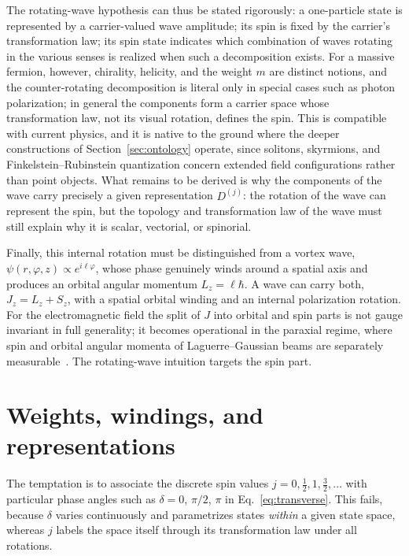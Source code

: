 \documentclass[11pt,a4paper]{article}
\begin{document}
The rotating-wave hypothesis can thus be stated rigorously: a one-particle state is represented by a
carrier-valued wave amplitude; its spin is fixed by the carrier's transformation law; its spin state
indicates which combination of waves rotating in the various senses is realized when such a decomposition
exists.
For a massive fermion, however, chirality, helicity, and the weight $m$ are distinct notions, and the
counter-rotating decomposition is literal only in special cases such as photon polarization; in general the
components form a carrier space whose transformation law, not its visual rotation, defines the spin.
This is compatible with current physics, and it is native to the ground where the deeper constructions of
Section~\ref{sec:ontology} operate, since solitons, skyrmions, and Finkelstein--Rubinstein quantization
concern extended field configurations rather than point objects.
What remains to be derived is why the components of the wave carry precisely a given representation
$D^{(j)}$: the rotation of the wave can represent the spin, but the topology and transformation law of the
wave must still explain why it is scalar, vectorial, or spinorial.

Finally, this internal rotation must be distinguished from a vortex wave,
$\psi(r, \varphi, z) \propto e^{i\ell\varphi}$, whose phase genuinely winds around a spatial axis and
produces an orbital angular momentum $L_z = \ell\hbar$.
A wave can carry both, $J_z = L_z + S_z$, with a spatial orbital winding and an internal polarization
rotation.
For the electromagnetic field the split of $J$ into orbital and spin parts is not gauge invariant in full
generality; it becomes operational in the paraxial regime, where spin and orbital angular momenta of
Laguerre--Gaussian beams are separately measurable~\cite{Allen1992}.
The rotating-wave intuition targets the spin part.

\section{Weights, windings, and representations}
\label{sec:representations}

The temptation is to associate the discrete spin values $j = 0, \tfrac12, 1, \tfrac32, \ldots$ with
particular phase angles such as $\delta = 0$, $\pi/2$, $\pi$ in Eq.~\eqref{eq:transverse}.
This fails, because $\delta$ varies continuously and parametrizes states \emph{within} a given state space,
whereas $j$ labels the space itself through its transformation law under all rotations.
\end{document}
